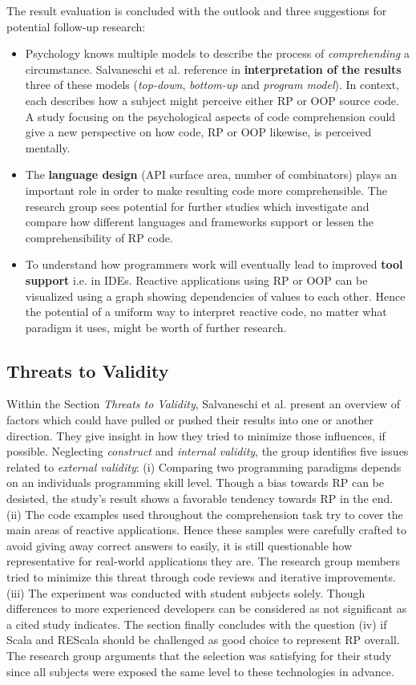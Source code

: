 \documentclass[12pt,a4paper]{article}
\begin{document}
The result evaluation is concluded with the outlook and three suggestions for potential follow-up research:

\begin{itemize}
	\item Psychology knows multiple models to describe the process of \emph{comprehending} a circumstance. Salvaneschi et al. reference in \textbf{interpretation of the results} three of these models (\emph{top-down}, \emph{bottom-up} and \emph{program model}). In context, each describes how a subject might perceive either RP or OOP source code. A study focusing on the psychological aspects of code comprehension could give a new perspective on how code, RP or OOP likewise, is perceived mentally.
	\item The \textbf{language design} (API surface area, number of combinators) plays an important role in order to make resulting code more comprehensible. The research group sees potential for further studies which investigate and compare how different languages and frameworks support or lessen the comprehensibility of RP code.
	\item To understand how programmers work will eventually lead to improved \textbf{tool support} i.e. in IDEs. Reactive applications using RP or OOP can be visualized using a graph showing dependencies of values to each other. Hence the potential of a uniform way to interpret reactive code, no matter what paradigm it uses, might be worth of further research.
\end{itemize}

\subsection{Threats to Validity}

Within the Section \emph{Threats to Validity}, Salvaneschi et al. present an overview of factors which could have pulled or pushed their results into one or another direction. They give insight in how they tried to minimize those influences, if possible. Neglecting \emph{construct} and \emph{internal validity}, the group identifies five issues related to \emph{external validity}: (i) Comparing two programming paradigms depends on an individuals programming skill level. Though a bias towards RP can be desisted, the study's result shows a favorable tendency towards RP in the end. (ii) The code examples used throughout the comprehension task try to cover the main areas of reactive applications. Hence these samples were carefully crafted to avoid giving away correct answers to easily, it is still questionable how representative for real-world applications they are. The research group members tried to minimize this threat through code reviews and iterative improvements. (iii) The experiment was conducted with student subjects solely. Though differences to more experienced developers can be considered as not significant as a cited study \cite{DiPenta} indicates. The section finally concludes with the question (iv) if Scala and REScala should be challenged as good choice to represent RP overall. The research group arguments that the selection was satisfying for their study since all subjects were exposed the same level to these technologies in advance.
\end{document}

